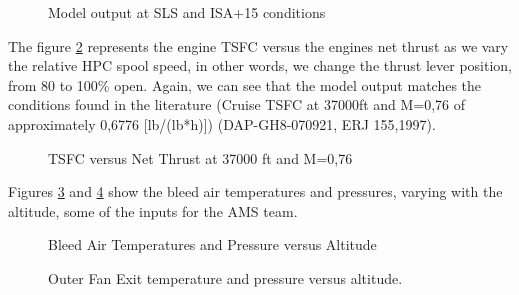 \begin{figure}[H] %
\caption{Model output at SLS and ISA+15 conditions}
\label{fig:SLSandISA}
\end{figure}


The figure \ref{fig:TSFC} represents the engine TSFC versus the engines net thrust as we vary the relative HPC spool speed, in other words, we change the thrust lever position, from 80 to 100\% open. Again, we can see that the model output matches the conditions found in the literature (Cruise TSFC at 37000ft and M=0,76 of approximately  0,6776 [lb/(lb*h)]) (DAP-GH8-070921, ERJ 155,1997).


\begin{figure}[H] %
\caption{TSFC versus Net Thrust at 37000 ft and M=0,76}
\label{fig:TSFC}
\end{figure}


Figures \ref{fig:BleedAir} and \ref{fig:FanAir} show the bleed air temperatures and pressures, varying with the altitude, some of the inputs for the AMS team.


\begin{figure}[H] %
\caption{Bleed Air Temperatures and Pressure versus Altitude}
\label{fig:BleedAir}
\end{figure}


\begin{figure}[H] %
\caption{Outer Fan Exit temperature and pressure versus altitude.}
\label{fig:FanAir}
\end{figure}


